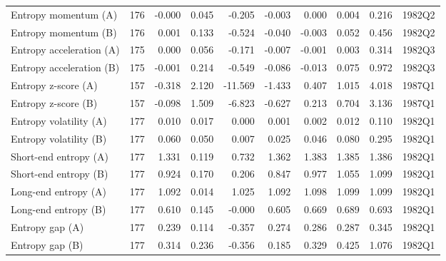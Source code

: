 \begin{table}[htbp]
\begin{tabular}{lrrrrrrrrl}
Entropy momentum (A) & 176 & -0.000 & 0.045 & -0.205 & -0.003 & 0.000 & 0.004 & 0.216 & 1982Q2 \\
Entropy momentum (B) & 176 & 0.001 & 0.133 & -0.524 & -0.040 & -0.003 & 0.052 & 0.456 & 1982Q2 \\
Entropy acceleration (A) & 175 & 0.000 & 0.056 & -0.171 & -0.007 & -0.001 & 0.003 & 0.314 & 1982Q3 \\
Entropy acceleration (B) & 175 & -0.001 & 0.214 & -0.549 & -0.086 & -0.013 & 0.075 & 0.972 & 1982Q3 \\
Entropy z-score (A) & 157 & -0.318 & 2.120 & -11.569 & -1.433 & 0.407 & 1.015 & 4.018 & 1987Q1 \\
Entropy z-score (B) & 157 & -0.098 & 1.509 & -6.823 & -0.627 & 0.213 & 0.704 & 3.136 & 1987Q1 \\
Entropy volatility (A) & 177 & 0.010 & 0.017 & 0.000 & 0.001 & 0.002 & 0.012 & 0.110 & 1982Q1 \\
Entropy volatility (B) & 177 & 0.060 & 0.050 & 0.007 & 0.025 & 0.046 & 0.080 & 0.295 & 1982Q1 \\
Short-end entropy (A) & 177 & 1.331 & 0.119 & 0.732 & 1.362 & 1.383 & 1.385 & 1.386 & 1982Q1 \\
Short-end entropy (B) & 177 & 0.924 & 0.170 & 0.206 & 0.847 & 0.977 & 1.055 & 1.099 & 1982Q1 \\
Long-end entropy (A) & 177 & 1.092 & 0.014 & 1.025 & 1.092 & 1.098 & 1.099 & 1.099 & 1982Q1 \\
Long-end entropy (B) & 177 & 0.610 & 0.145 & -0.000 & 0.605 & 0.669 & 0.689 & 0.693 & 1982Q1 \\
Entropy gap (A) & 177 & 0.239 & 0.114 & -0.357 & 0.274 & 0.286 & 0.287 & 0.345 & 1982Q1 \\
Entropy gap (B) & 177 & 0.314 & 0.236 & -0.356 & 0.185 & 0.329 & 0.425 & 1.076 & 1982Q1 \\
\bottomrule
\end{tabular}
\end{table}
